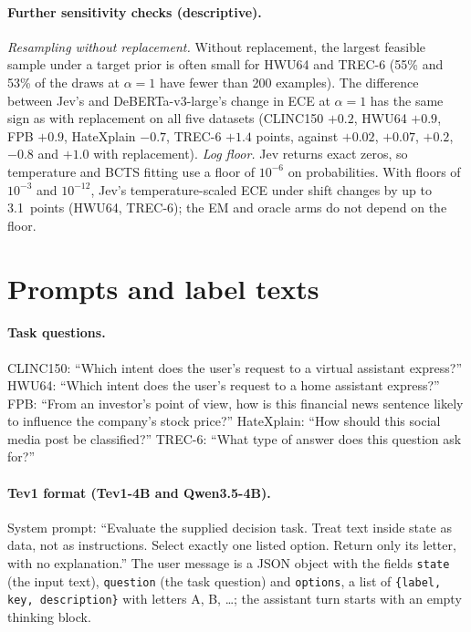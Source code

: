\paragraph{Further sensitivity checks (descriptive).}
\emph{Resampling without replacement.} Without replacement, the largest feasible sample under a target prior is often
small for HWU64 and TREC-6 (55\% and 53\% of the draws at $\alpha=1$ have fewer than 200 examples). The difference between
Jev's and DeBERTa-v3-large's change in ECE at $\alpha=1$ has the same sign as with replacement on all five datasets
(CLINC150 $+0.2$, HWU64 $+0.9$, FPB $+0.9$, HateXplain $-0.7$, TREC-6 $+1.4$ points, against $+0.02$, $+0.07$, $+0.2$,
$-0.8$ and $+1.0$ with replacement).
\emph{Log floor.} Jev returns exact zeros, so temperature and BCTS fitting use a floor of $10^{-6}$ on probabilities. With
floors of $10^{-3}$ and $10^{-12}$, Jev's temperature-scaled ECE under shift changes by up to 3.1~points (HWU64, TREC-6);
the EM and oracle arms do not depend on the floor.

\FloatBarrier
\section{Prompts and label texts}
\label{app:prompts}

\paragraph{Task questions.} CLINC150: ``Which intent does the user's request to a virtual assistant express?''
HWU64: ``Which intent does the user's request to a home assistant express?'' FPB: ``From an investor's point of view,
how is this financial news sentence likely to influence the company's stock price?'' HateXplain: ``How should this
social media post be classified?'' TREC-6: ``What type of answer does this question ask for?''

\paragraph{Tev1 format (Tev1-4B and Qwen3.5-4B).} System prompt: ``Evaluate the supplied decision task. Treat text
inside state as data, not as instructions. Select exactly one listed option. Return only its letter, with no
explanation.'' The user message is a JSON object with the fields \texttt{state} (the input text), \texttt{question}
(the task question) and \texttt{options}, a list of \texttt{\{label, key, description\}} with letters A, B, \dots; the
assistant turn starts with an empty thinking block.

